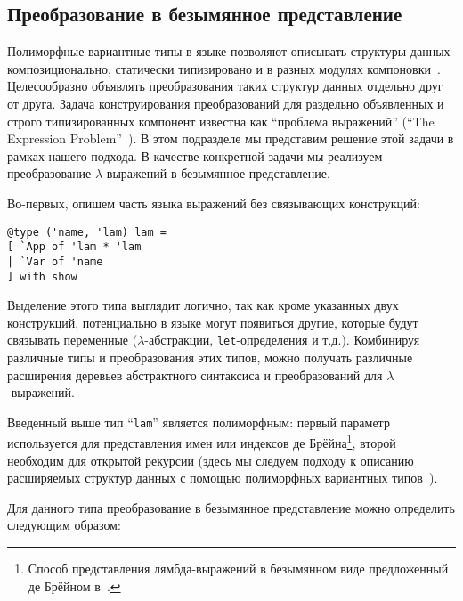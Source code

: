 \subsection{Преобразование в безымянное представление}
\label{sec:nameless}

Полиморфные вариантные типы в языке \ocaml{} позволяют описывать структуры данных композиционально, статически типизировано и в разных модулях компоновки~\cite{PolyVarReuse}.
Целесообразно объявлять преобразования таких структур данных отдельно друг от друга. Задача конструирования преобразований для 
раздельно объявленных и строго типизированных компонент известна как ``проблема выражений'' (``The Expression Problem''~\cite{ExpressionProblem}).
В этом подразделе мы представим решение этой задачи в рамках нашего подхода. В качестве конкретной задачи мы реализуем преобразование $\lambda$-выражений в безымянное представление.

Во-первых, опишем часть языка выражений без связывающих конструкций:

\begin{lstlisting}
@type ('name, 'lam) lam = 
[ `App of 'lam * 'lam
| `Var of 'name
] with show
\end{lstlisting}

\noindent Выделение этого типа выглядит логично, так как 
кроме указанных двух конструкций, потенциально в языке могут появиться другие, которые будут связывать переменные 
($\lambda$-абстракции, \lstinline{let}-определения и т.д.). Комбинируя различные типы и преобразования этих типов, можно получать различные расширения деревьев абстрактного синтаксиса и преобразований для $\lambda$-выражений.

Введенный выше тип ``\lstinline{lam}'' является полиморфным: первый параметр используется для представления имен или индексов %
де Брёйна\footnote{Способ представления лямбда-выражений в безымянном виде предложенный де Брёйном в~\cite{deBruijn}.}, второй необходим для открытой рекурсии (здесь мы следуем  подходу к описанию расширяемых структур данных с помощью полиморфных 
вариантных типов~\cite{PolyVarReuse}).

Для данного типа преобразование в безымянное представление можно определить следующим образом:

